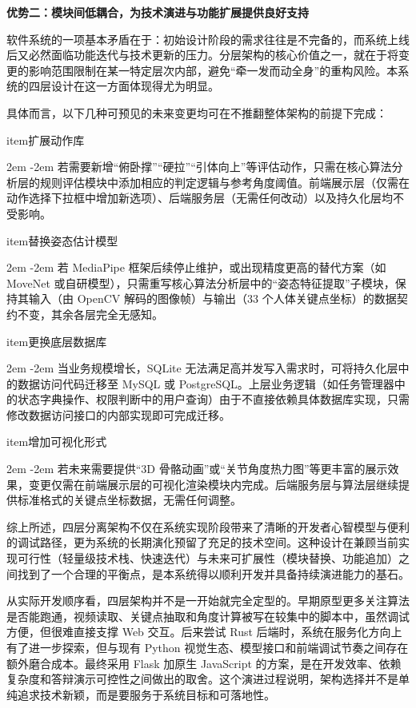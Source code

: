 \documentclass[UTF8,twoside]{ctexrep}
\makeatletter
\def@NAT@last@yr{\@citea}%
\def@NAT@last@yr{-\NAT@penalty}%
\newcommand{\listbodyaligntext}[1]{%
  \par\begingroup
    \parindent=0pt
    \parshape=2 2em \dimexpr\textwidth-2em\relax 0pt \textwidth
    \noindent\ignorespaces#1\unskip\par
  \endgroup
}
\newcommand{\researchitem}[2]{%
  \csname item\endcsname #1%
  \listbodyaligntext{#2}%
}
\makeatother
\begin{document}
\textbf{优势二：模块间低耦合，为技术演进与功能扩展提供良好支持}

软件系统的一项基本矛盾在于：初始设计阶段的需求往往是不完备的，而系统上线后又必然面临功能迭代与技术更新的压力。分层架构的核心价值之一，就在于将变更的影响范围限制在某一特定层次内部，避免“牵一发而动全身”的重构风险。本系统的四层设计在这一方面体现得尤为明显。

具体而言，以下几种可预见的未来变更均可在不推翻整体架构的前提下完成：

\begin{researchlist}
  
\researchitem{扩展动作库}{若需要新增“俯卧撑”“硬拉”“引体向上”等评估动作，只需在核心算法分析层的规则评估模块中添加相应的判定逻辑与参考角度阈值。前端展示层（仅需在动作选择下拉框中增加新选项）、后端服务层（无需任何改动）以及持久化层均不受影响。}

  
\researchitem{替换姿态估计模型}{若 MediaPipe 框架后续停止维护，或出现精度更高的替代方案（如 MoveNet 或自研模型），只需重写核心算法分析层中的“姿态特征提取”子模块，保持其输入（由 OpenCV 解码的图像帧）与输出（33 个人体关键点坐标）的数据契约不变，其余各层完全无感知。}

  
\researchitem{更换底层数据库}{当业务规模增长，SQLite 无法满足高并发写入需求时，可将持久化层中的数据访问代码迁移至 MySQL 或 PostgreSQL。上层业务逻辑（如任务管理器中的状态字典操作、权限判断中的用户查询）由于不直接依赖具体数据库实现，只需修改数据访问接口的内部实现即可完成迁移。}

  
\researchitem{增加可视化形式}{若未来需要提供“3D 骨骼动画”或“关节角度热力图”等更丰富的展示效果，变更仅需在前端展示层的可视化渲染模块内完成。后端服务层与算法层继续提供标准格式的关键点坐标数据，无需任何调整。}
\end{researchlist}

综上所述，四层分离架构不仅在系统实现阶段带来了清晰的开发者心智模型与便利的调试路径，更为系统的长期演化预留了充足的技术空间。这种设计在兼顾当前实现可行性（轻量级技术栈、快速迭代）与未来可扩展性（模块替换、功能追加）之间找到了一个合理的平衡点，是本系统得以顺利开发并具备持续演进能力的基石。

从实际开发顺序看，四层架构并不是一开始就完全定型的。早期原型更多关注算法是否能跑通，视频读取、关键点抽取和角度计算被写在较集中的脚本中，虽然调试方便，但很难直接支撑 Web 交互。后来尝试 Rust 后端时，系统在服务化方向上有了进一步探索，但与现有 Python 视觉生态、模型接口和前端调试节奏之间存在额外磨合成本。最终采用 Flask 加原生 JavaScript 的方案，是在开发效率、依赖复杂度和答辩演示可控性之间做出的取舍。这个演进过程说明，架构选择并不是单纯追求技术新颖，而是要服务于系统目标和可落地性。
\end{document}
